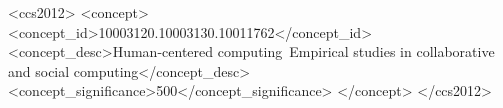 \documentclass[manuscript,screen]{acmart}
\begin{document}
\begin{CCSXML}
<ccs2012>
  <concept>
      <concept_id>10003120.10003130.10011762</concept_id>
      <concept_desc>Human-centered computing~Empirical studies in collaborative and social computing</concept_desc>
      <concept_significance>500</concept_significance>
     </concept>
 </ccs2012>
\end{CCSXML}




\maketitle
\end{document}
